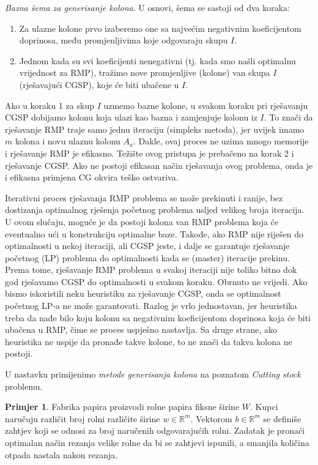 \documentclass[b5paper, utf8, 11pt, colorlinks]{book}
\theoremstyle{definition}
\newtheorem{primjer}{Primjer}[chapter]
\begin{document}
\emph{Bazna šema za generisanje kolona}. U osnovi, šema se sastoji od dva koraka:
\begin{enumerate}
	\item  Za ulazne kolone prvo izaberemo one sa najvećim negativnim koeficijentom doprinosa, među promjenljivima koje odgovaraju skupu $I$.
	\item Jednom kada su svi koeficijenti nenegativni (tj. kada smo našli optimalnu vrijednost za  RMP), tražimo nove promjenljive (kolone) van skupa $I$ (rješavajući CGSP), koje će biti ubačene u $I$. 
\end{enumerate}
Ako u koraku 1 za skup $I$ uzmemo bazne kolone, u svakom koraku pri rješavanju CGSP dobijamo kolonu koja ulazi kao bazna i zamjenjuje kolonu iz $I$. To znači da rješavanje RMP traje samo jednu iteraciju (simpleks metoda), jer uvijek imamo $m$ kolona i novu ulaznu kolonu $A_a$. Dakle, ovaj proces ne uzima mnogo memorije i rješavanje RMP je efikasno. Težište ovog pristupa je   prebačeno na korak 2 i rješavanje CGSP. Ako ne postoji efikasan način rješavanja ovog problema, onda je i efikasna primjena CG okvira teško ostvariva.  
 

Iterativni proces rješavanja RMP problema se može prekinuti i ranije, bez dostizanja optimalnog rješenja početnog problema usljed velikog broja iteracija. U ovom slučaju, moguće je da postoji kolona van RMP problema koja će eventualno ući u konstrukciju optimalne baze.  Takođe, ako RMP nije riješen do optimalnosti u nekoj iteraciji, ali CGSP jeste, i dalje se garantuje rješavanje početnog (LP) problema do optimalnosti kada se (master) iteracije prekinu. Prema tome, rješavanje RMP problema u svakoj iteraciji nije toliko bitno dok god rješavamo CGSP do optimalnosti u svakom koraku. Obrnuto ne vrijedi.   Ako bismo iskoristili neku heuristiku za rješavanje CGSP, onda se optimalnost početnog LP-a ne može garantovati. Razlog je vrlo jednostavan, jer heuristika treba da nađe bilo koju kolonu sa negativnim koeficijentom doprinosa koja će biti ubačena u RMP, čime se proces uspješno nastavlja. Sa druge strane, ako heuristika ne uspije da pronađe takve kolone, to ne znači da takva kolona ne postoji. 


 U nastavku primijenimo \emph{metode generisanja kolona} na poznatom \emph{Cutting stock} problemu. 
 
\begin{primjer} Fabrika papira proizvodi rolne papira fiksne širine  $W$. 
 Kupci naručuju različit broj rolni različite širine $w \in \mathbb{R}^m$. Vektorom $b \in \mathbb{R}^m$ se definiše zahtjev koji se odnosi za broj naručenih odgovarajućih rolni.  Zadatak je pronaći optimalan način  rezanja velike rolne da bi se zahtjevi ispunili, a smanjila količina otpada nastala nakon rezanja. 
 \end{primjer}
\end{document}
